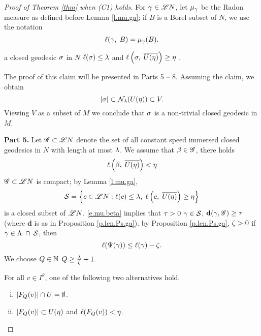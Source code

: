 \documentclass[11pt,twoside]{article}
\begin{document}
\begin{proof}[Proof of Theorem \ref{thm} when (C1) holds]
For \(\gamma\in\mathscr{L} N\), let \(\mu_{\gamma} \) be the Radon measure as defined before Lemma \ref{l.mu.ga}; if $B$ is a Borel subset of \(N\), we use the notation
\[\ell(\gamma,\;B)=\mu_{\gamma}(B). \]

\begin{clm}\label{c.geodesic}
	\Tes a closed geodesic \(\sigma\) in \(N\) \st \(\ell(\sigma)\leq \lambda\) and \(\ell\left(\sigma,\;\overline{U(\eta)}\right)\geq \eta\) .
\end{clm}
The proof of this claim will be presented in Parts 5 -- 8. Assuming the claim, we obtain
\[\left|\sigma\right|\subset \mathcal{N}_{\lambda}(U(\eta))\subset V.\]
Viewing \(V\) as a subset of \(M\) we conclude that \(\sigma\) is a non-trivial closed geodesic in \(M\).

\noindent\textbf{Part 5.} Let \(\mathscr{G} \subset \mathscr{L} N\) denote the set of all constant speed immersed closed geodesics in \(N\) with length at most \(\lambda\). We assume that \fa \(\beta\in \mathscr{G}\), there holds 
\begin{equation}\label{e.mu.beta}
\ell\left(\beta,\;\overline{U(\eta)}\right)<\eta
\end{equation} 
\(\mathscr{G}\subset \mathscr{L} N\) is compact; by Lemma \ref{l.mu.ga},
\[\mathcal{S}=\left\{c\in\mathscr{L} N:\ell(c)\leq \lambda,\;\ell\left(c,\;\overline{U(\eta)}\right)\geq \eta\right\} \]
is a closed subset of $\mathscr{L} N$. \hn \eqref{e.mu.beta} implies that \tes \(\tau>0\) \st \fa $\gamma\in\mathcal{S}$, \(\mathbf{d}(\gamma,\mathscr{G})\geq \tau\) (where $\mathbf{d}$ is as in Proposition \ref{p.len.Ps.ga}). \tf by Proposition \ref{p.len.Ps.ga}, \tes \(\zeta>0\) \st if \(\gamma\in \Lambda\;\cap\:\mathcal{S}\), then 
\begin{equation}\label{e.ze}
\ell(\Psi(\gamma))\leq \ell(\gamma)-\zeta.
\end{equation}
We choose $Q\in \mathbb{N}$ \st \(Q\geq \frac{\lambda}{\zeta} +1.\)
\begin{lem}\label{l.F_Q(v)}
For all \(v\in I^k\), one of the following two alternatives hold.
\begin{enumerate}[(i)]
	\item \(\left|F_Q(v)\right|\cap U=\emptyset\).
	\item \(\left|F_Q(v)\right|\subset U(\eta)\) and \(\ell(F_Q(v))<\eta\).
\end{enumerate}
\end{lem}


\end{proof}
\end{document}
